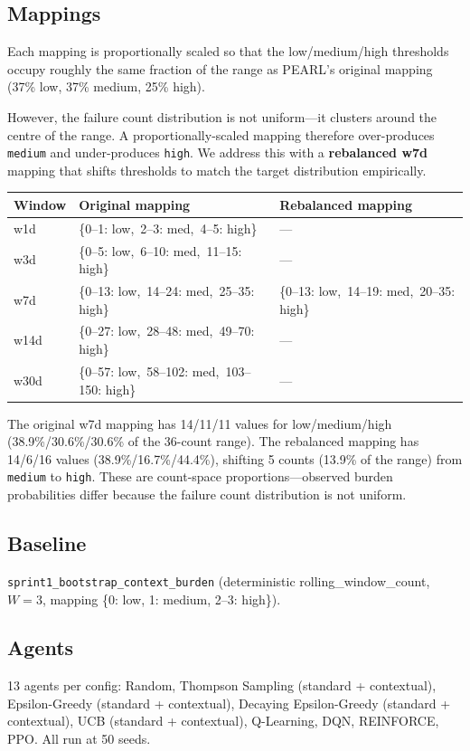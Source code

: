 \documentclass[11pt,a4paper]{article}
\begin{document}
\subsection{Mappings}
Each mapping is proportionally scaled so that the low/medium/high
thresholds occupy roughly the same fraction of the range as PEARL's
original mapping (37\% low, 37\% medium, 25\% high).

However, the failure count distribution is not uniform---it clusters
around the centre of the range.  A proportionally-scaled mapping
therefore over-produces \texttt{medium} and under-produces \texttt{high}.
We address this with a \textbf{rebalanced w7d} mapping that shifts
thresholds to match the target distribution empirically.

\begin{center}
\begin{tabular}{l l l}
\toprule
Window & Original mapping & Rebalanced mapping \\
\midrule
w1d  & \{0--1: low,\ 2--3: med,\ 4--5: high\} & --- \\
w3d  & \{0--5: low,\ 6--10: med,\ 11--15: high\} & --- \\
w7d  & \{0--13: low,\ 14--24: med,\ 25--35: high\} & \{0--13: low,\ 14--19: med,\ 20--35: high\} \\
w14d & \{0--27: low,\ 28--48: med,\ 49--70: high\} & --- \\
w30d & \{0--57: low,\ 58--102: med,\ 103--150: high\} & --- \\
\bottomrule
\end{tabular}
\end{center}

\noindent The original w7d mapping has 14/11/11 values for low/medium/high
(38.9\%/30.6\%/30.6\% of the 36-count range).  The rebalanced mapping
has 14/6/16 values (38.9\%/16.7\%/44.4\%), shifting 5 counts
(13.9\% of the range) from \texttt{medium} to \texttt{high}.  These
are count-space proportions---observed burden probabilities differ
because the failure count distribution is not uniform.

\subsection{Baseline}
\texttt{sprint1\_bootstrap\_context\_burden} (deterministic
rolling\_window\_count, $W{=}3$, mapping
\{0: low, 1: medium, 2--3: high\}).

\subsection{Agents}
13 agents per config: Random, Thompson Sampling (standard + contextual),
Epsilon-Greedy (standard + contextual), Decaying Epsilon-Greedy
(standard + contextual), UCB (standard + contextual), Q-Learning, DQN,
REINFORCE, PPO.  All run at 50 seeds.
\end{document}
